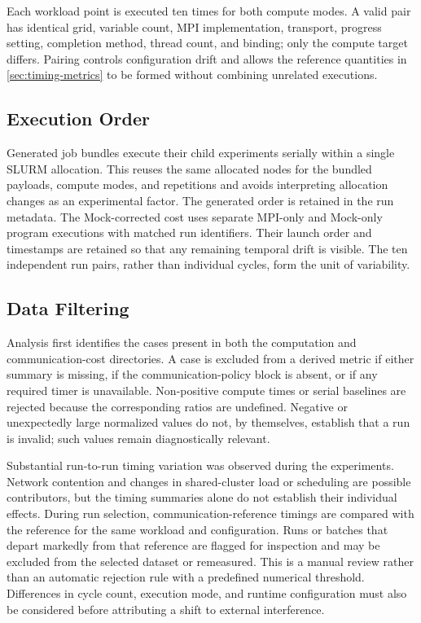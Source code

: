 Each workload point is executed ten times for both compute modes. A valid
pair has identical grid, variable count, MPI implementation, transport,
progress setting, completion method, thread count, and binding; only the
compute target differs. Pairing controls configuration drift and allows the
reference quantities in \autoref{sec:timing-metrics} to be formed without
combining unrelated executions.

\subsection{Execution Order}

Generated job bundles execute their child experiments serially within a
single SLURM allocation. This reuses the same allocated nodes for the bundled
payloads, compute modes, and repetitions and avoids interpreting allocation
changes as an experimental factor. The generated order is retained in the run
metadata. The Mock-corrected cost uses separate MPI-only and Mock-only
program executions with matched run identifiers. Their launch order and
timestamps are retained so that any remaining temporal drift is visible. The
ten independent run pairs, rather than individual cycles, form the unit of
variability.

\subsection{Data Filtering}

Analysis first identifies the cases present in both the computation
and communication-cost directories. A case is excluded from a derived metric if
either summary is missing, if the communication-policy
block is absent, or if any required timer is unavailable. Non-positive compute
times or serial baselines are rejected because the corresponding ratios are
undefined. Negative or unexpectedly large normalized values do not, by
themselves, establish that a run is invalid; such values remain diagnostically
relevant.

Substantial run-to-run timing variation was observed during the experiments.
Network contention and changes in shared-cluster load or scheduling are
possible contributors, but the timing summaries alone do not establish their
individual effects. During run selection, communication-reference timings
are compared with the reference for the same workload and configuration.
Runs or batches that depart markedly from that reference are flagged for
inspection and may be excluded from the selected dataset or remeasured.
This is a manual review rather than an automatic rejection rule with a
predefined numerical threshold. Differences in cycle count, execution mode,
and runtime configuration must also be considered before attributing a shift
to external interference.

